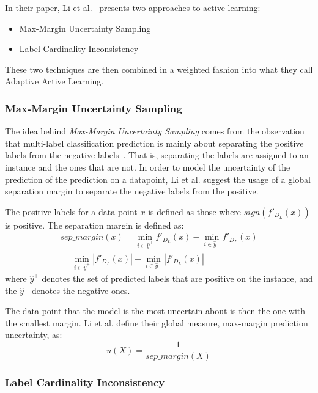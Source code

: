 In their paper, Li et al\@.~\cite{li2013active} presents two approaches to active learning:
\begin{itemize}
    \item Max-Margin Uncertainty Sampling
    \item Label Cardinality Inconsistency 
\end{itemize}
These two techniques are then combined in a weighted fashion into what they call Adaptive Active Learning.

\subsubsection{Max-Margin Uncertainty Sampling}

The idea behind \textit{Max-Margin Uncertainty Sampling} comes from the observation that multi-label classification prediction is mainly about separating the positive labels from the negative labels~\cite{li2013active}.
That is, separating the labels are assigned to an instance and the ones that are not.
In order to model the uncertainty of the prediction of the prediction on a datapoint, Li et al\@. suggest the usage of a global separation margin to separate the negative labels from the positive.

The positive labels for a data point $x$ is defined as those where $sign(f'_{D_L}(x))$ is positive.
The separation margin is defined as:
\begin{equation}
    \begin{split}
        sep\_margin(x) = \min_{i \in \hat{y}^+}f'_{D_L}(x) - \min_{i \in \hat{y}^-}f'_{D_L}(x) \\
        = \min_{i \in \hat{y}^+}|f'_{D_L}(x)| + \min_{i \in \hat{y}^-}|f'_{D_L}(x)|
    \end{split}
\end{equation}
where $\hat{y}^+$ denotes the set of predicted labels that are positive on the instance, and the $\hat{y}^-$ denotes the negative ones.

The data point that the model is the most uncertain about is then the one with the smallest margin.
Li et al\@. define their global measure, max-margin prediction uncertainty, as:
\begin{equation}
    u(X) = \frac{1}{sep\_margin(X)}
\end{equation}

\subsubsection{Label Cardinality Inconsistency}

